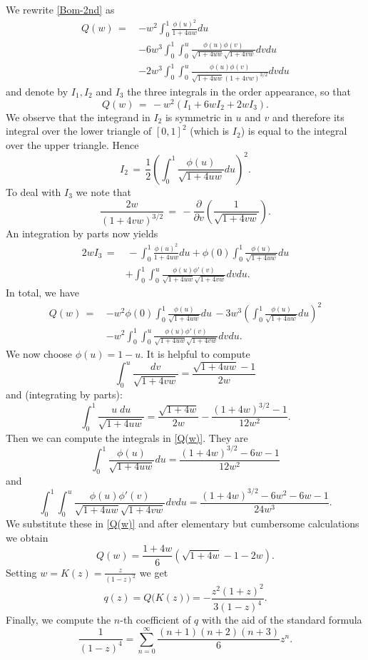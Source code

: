 \documentclass[11pt,reqno]{amsart}
\theoremstyle{plain}
\theoremstyle{definition}
\theoremstyle{remark}
\begin{document}
We rewrite \eqref{Bom-2nd} as 
\begin{align*}
Q(w)   \, = \, & - w^2 \int_0^1 \frac{\phi(u)^2}{1+4uw} du \\
& -6 w^3 \int_0^1  \int_0^u  \frac{\phi(u)\phi(v)}{\sqrt{1+4uw}\sqrt{1+4vw}}dv du \\
& -2 w^3 \int_0^1  \int_0^u  \frac{\phi(u)\phi(v)}{\sqrt{1+4uw}(1+4vw)^{3/2}}dv du
\end{align*}
and denote by $I_1, I_2$ and $I_3$ the three integrals in the order appearance, so that 
$$
Q(w) \, = \, -w^2 (I_1 + 6w I_2 + 2w I_3).
$$
We observe that the integrand in $I_2$ is symmetric in $u$ and $v$ and therefore its integral over the lower triangle of $[0,1]^2$ (which is $I_2$) is equal to the integral over the upper triangle. Hence 
$$
I_2 \, = \, \frac{1}{2} \left( \int_0^1 \frac{\phi(u)}{\sqrt{1+4uw} }du \right)^2. 
$$
To deal with $I_3$ we note that 
$$
\frac{2w}{(1+4vw)^{3/2} } \, = \, - \frac{\partial}{\partial v }  \left( \frac{1}{\sqrt{1+4vw}} \right).
$$
An integration by parts now yields
\begin{align*}
2w I_3  \,= &\, - \int_0^1 \frac{\phi(u)^2}{1+4uw} du + \phi(0) \int_0^1 \frac{\phi(u)}{\sqrt{1+4uw} }du \\
& + \int_0^1  \int_0^u  \frac{\phi(u)\phi'(v)}{\sqrt{1+4uw}\sqrt{1+4vw}}dv du. 
\end{align*}
In total, we have
\begin{align} \label{Q(w)}
Q(w)   \, = \, & -w^2 \phi(0) \int_0^1 \frac{\phi(u)}{\sqrt{1+4uw} }du \, -3w^3 \left( \int_0^1 \frac{\phi(u)}{\sqrt{1+4uw} }du \right)^2 \\ 
& - w^2 \int_0^1  \int_0^u  \frac{\phi(u)\phi'(v)}{\sqrt{1+4uw}\sqrt{1+4vw}}dv du. \nonumber
\end{align}
We now choose $\phi(u) = 1-u$. It is helpful to compute
$$
\int_0^u  \frac{dv}{\sqrt{1+4vw}}  =  \frac{\sqrt{1+4uw}-1}{2w}
$$
and (integrating by parts): 
$$
\int_0^1 \frac{u \;du }{\sqrt{1+4uw}} =  \frac{\sqrt{1+4w}}{2w} - \frac{(1+4w)^{3/2}-1}{12w^2}.
$$
Then we can compute the integrals in \eqref{Q(w)}. They are
$$
\int_0^1 \frac{\phi(u)}{\sqrt{1+4uw} }du = \frac{(1+4w)^{3/2}-6w-1}{12w^2}
$$
and 
$$
\int_0^1  \int_0^u  \frac{\phi(u)\phi'(v)}{\sqrt{1+4uw}\sqrt{1+4vw}}dv du = \frac{(1+4w)^{3/2}-6w^2-6w-1}{24w^3}.
$$
We substitute these in \eqref{Q(w)} and after elementary but cumbersome calculations we obtain
$$
Q(w)  = \frac{1+4w}{6} \left( \sqrt{1+4w}  -1 -2w \right). 
$$
Setting $w=K(z) = \frac{z}{(1-z)^2}$ we get
$$
q(z) = Q\big(K(z)\big) = -\frac{z^2(1+z)^2}{3(1-z)^4}.
$$
Finally, we compute the $n$-th coefficient of $q$ with the aid of the standard formula 
$$
\frac{1}{(1-z)^4} = \sum_{n=0}^\infty \frac{(n+1)(n+2)(n+3)}{6} z^n.
$$ 
\end{document}

